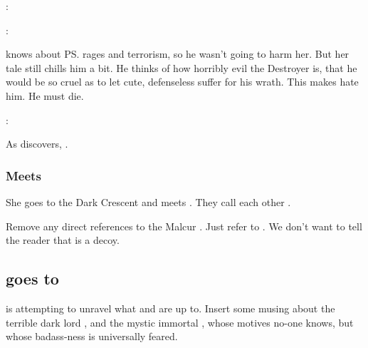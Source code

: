\begin{garbage}
\begin{prose}
  \Teshrial: 
  
  \Criseis:
\end{prose}

\Teshrial{} knows about \ps{\Ishnaruchaefir} rages and terrorism, so he wasn't going to harm her. 
But her tale still chills him a bit. 
He thinks of how horribly evil the Destroyer is, that he would be so cruel as to let cute, defenseless \humans{} suffer for his wrath. 
This makes \Teshrial{} hate him.
He must die. 

\begin{prose}
  \Teshrial: 
\end{prose}


As \Teshrial{} discovers, \Ishnaruchaefir{} . 





\subsubsection[Meets Psyrex]{Meets \Psyrex}
She goes to the Dark Crescent and meets \LocarPsyrex. 
They call each other . 

Remove any direct references to the Malcur \nexus. 
Just refer to . 
We don't want to tell the reader that \Forklin{} is a decoy. 









\subsection{\Achsah{} goes to \Forklin}
\Achsah{} is attempting to unravel what \Ishnaruchaefir{} and \Secherdamon{} are up to. 
Insert some musing about the terrible dark lord \Secherdamon, and the mystic immortal \Ishna, whose motives no-one knows, but whose badass-ness is universally feared. 


\end{garbage}
